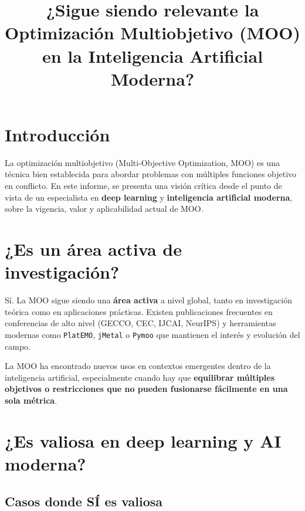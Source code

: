 \documentclass[12pt]{article}
\title{\textbf{¿Sigue siendo relevante la Optimización Multiobjetivo (MOO) en la Inteligencia Artificial Moderna?}}
\author{}
\date{}
\begin{document}
\maketitle

\section*{Introducción}

La optimización multiobjetivo (Multi-Objective Optimization, MOO) es una técnica bien establecida para abordar problemas con múltiples funciones objetivo en conflicto. En este informe, se presenta una visión crítica desde el punto de vista de un especialista en \textbf{deep learning} y \textbf{inteligencia artificial moderna}, sobre la vigencia, valor y aplicabilidad actual de MOO.

\section*{¿Es un área activa de investigación?}

Sí. La MOO sigue siendo una \textbf{área activa} a nivel global, tanto en investigación teórica como en aplicaciones prácticas. Existen publicaciones frecuentes en conferencias de alto nivel (GECCO, CEC, IJCAI, NeurIPS) y herramientas modernas como \texttt{PlatEMO}, \texttt{jMetal} o \texttt{Pymoo} que mantienen el interés y evolución del campo.

La MOO ha encontrado nuevos usos en contextos emergentes dentro de la inteligencia artificial, especialmente cuando hay que \textbf{equilibrar múltiples objetivos o restricciones que no pueden fusionarse fácilmente en una sola métrica}.

\section*{¿Es valiosa en deep learning y AI moderna?}

\subsection*{Casos donde \textbf{SÍ} es valiosa}
\end{document}

